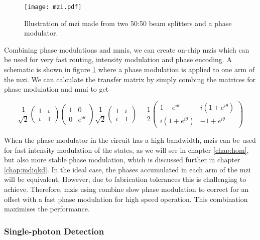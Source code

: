 \begin{figure}[t]
	\centering
	\texttt{[image: mzi.pdf]}
	\caption[Mach-Zehnder interferometer schematic]{Illustration of \acs{mzi} made from two 50:50 beam splitters and a phase modulator.}
	\label{fig:mzi}
\end{figure}

Combining phase modulations and \acp{mmi}, we can create on-chip \acp{mzi} which can be used for very fast routing, intensity modulation and phase encoding. A schematic is shown in figure \ref{fig:mzi} where a phase modulation is applied to one arm of the \ac{mzi}.  We can calculate the transfer matrix by simply combing the matrices for phase modulation and \ac{mmi} to get

\begin{equation}
	\frac{1}{\sqrt{2}}\left(
	\begin{matrix}
	1 & i\\
	i & 1
	\end{matrix}
	\right)
	\left(
	\begin{matrix}
	1 & 0\\
	0 & e^{i\theta}
	\end{matrix}
	\right)
	\frac{1}{\sqrt{2}}\left(
	\begin{matrix}
	1 & i\\
	i & 1
	\end{matrix}
	\right)=
	\frac{1}{2}\left(
	\begin{matrix}
	1 - e^{i\theta} & i(1 +  e^{i\theta})\\
	i(1 +  e^{i\theta}) & -1 +  e^{i\theta}
	\end{matrix}
	\right)
\end{equation}

When the phase modulator in the circuit has a high bandwidth, \acp{mzi} can be used for fast intensity modulation of the states, as we will see in chapter \ref{chap:hom}, but also more stable phase modulation, which is discussed further in chapter \ref{chap:mdiqkd}. In the ideal case, the phases accumulated in each arm of the \ac{mzi} will be equivalent. However, due to fabrication tolerances this is challenging to achieve. Therefore, \acp{mzi} using combine slow phase modulation to correct for an offset with a fast phase modulation for high speed operation. This combination maximises the performance.

\subsubsection*{Single-photon Detection}

